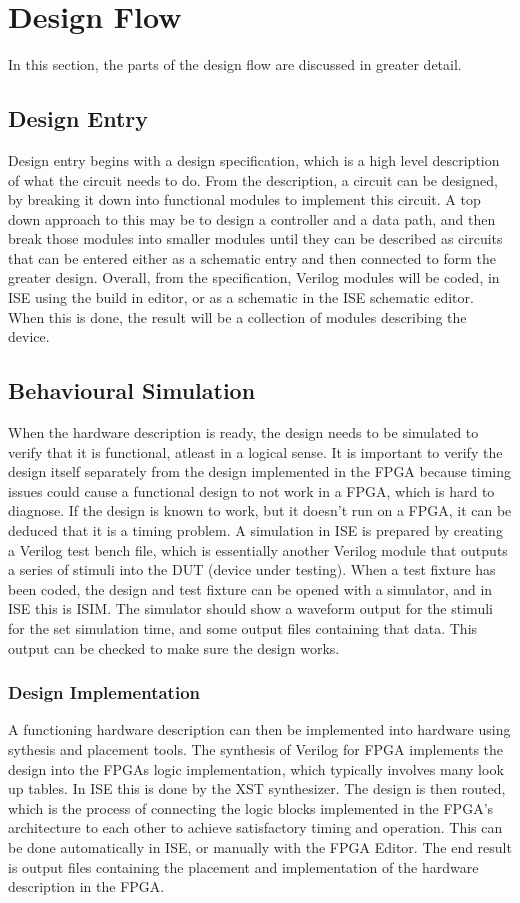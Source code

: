 \documentclass[12pt]{article}
\begin{document}
\section{Design Flow}
In this section, the parts of the design flow are discussed in greater detail.
\subsection*{Design Entry}
Design entry begins with a design specification, which is a high level description of what the circuit needs to do. From the description, a circuit can be designed, by breaking it down into functional modules to implement this circuit. A top down approach to this may be to design a controller and a data path, and then break those modules into smaller modules until they can be described as circuits that can be entered either as a schematic  entry and then connected to form the greater design. Overall, from the specification, Verilog modules will be coded, in ISE using the build in editor, or as a schematic in the ISE schematic editor. When this is done, the result will be a collection of modules describing the device.
\subsection*{Behavioural Simulation}
When the hardware description is ready, the design needs to be simulated to verify that it is functional, atleast in a logical sense. It is important to verify the design itself separately from the design implemented in the FPGA because timing issues could cause a functional design to not work in a FPGA, which is hard to diagnose. If the design is known to work, but it doesn't run on a FPGA, it can be deduced that it is a timing problem. A simulation in ISE is prepared by creating a Verilog test bench file, which is essentially another Verilog module that outputs a series of stimuli into the DUT (device under testing). When a test fixture has been coded, the design and test fixture can be opened with a simulator, and in ISE this is ISIM. The simulator should show a waveform output for the stimuli for the set simulation time, and some output files containing that data. This output can be checked to make sure the design works.
\subsubsection*{Design Implementation}
A functioning hardware description can then be implemented into hardware using sythesis and placement tools. The synthesis of Verilog for FPGA implements the design into the FPGAs logic implementation, which typically involves many look up tables. In ISE this is done by the XST synthesizer. The design is then routed, which is the process of connecting the logic blocks implemented in the FPGA's architecture to each other to achieve satisfactory timing and operation. This can be done automatically in ISE, or manually with the FPGA Editor. The end result is output files containing the placement and implementation of the hardware description in the FPGA.
\end{document}
